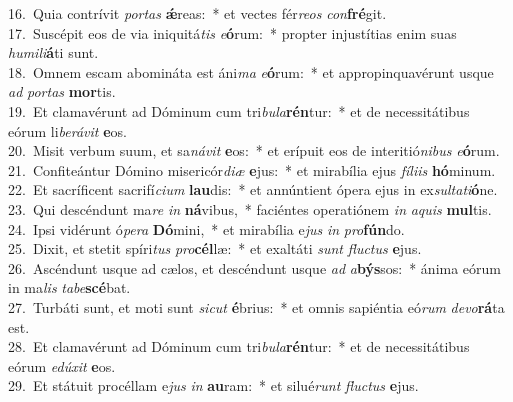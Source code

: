 {16.~}Quia contrívit \textit{por}\textit{tas} \textbf{ǽ}reas:~* et vectes fér\textit{re}\textit{os} \textit{con}\textbf{fré}git.\\
{17.~}Suscépit eos de via iniquitá\textit{tis} \textit{e}\textbf{ó}rum:~* propter injustítias enim suas \textit{hu}\textit{mi}\textit{li}\textbf{á}ti sunt.\\
{18.~}Omnem escam abomináta est áni\textit{ma} \textit{e}\textbf{ó}rum:~* et appropinquavérunt usque \textit{ad} \textit{por}\textit{tas} \textbf{mor}tis.\\
{19.~}Et clamavérunt ad Dóminum cum tri\textit{bu}\textit{la}\textbf{rén}tur:~* et de necessitátibus eórum li\textit{be}\textit{rá}\textit{vit} \textbf{e}os.\\
{20.~}Misit verbum suum, et sa\textit{ná}\textit{vit} \textbf{e}os:~* et erípuit eos de interitió\textit{ni}\textit{bus} \textit{e}\textbf{ó}rum.\\
{21.~}Confiteántur Dómino misericór\textit{di}\textit{æ} \textbf{e}jus:~* et mirabília ejus \textit{fí}\textit{li}\textit{is} \textbf{hó}minum.\\
{22.~}Et sacríficent sacrifí\textit{ci}\textit{um} \textbf{lau}dis:~* et annúntient ópera ejus in ex\textit{sul}\textit{ta}\textit{ti}\textbf{ó}ne.\\
{23.~}Qui descéndunt ma\textit{re} \textit{in} \textbf{ná}vibus,~* faciéntes operatiónem \textit{in} \textit{a}\textit{quis} \textbf{mul}tis.\\
{24.~}Ipsi vidérunt ó\textit{pe}\textit{ra} \textbf{Dó}mini,~* et mirabília e\textit{jus} \textit{in} \textit{pro}\textbf{fún}do.\\
{25.~}Dixit, et stetit spíri\textit{tus} \textit{pro}\textbf{cél}læ:~* et exaltáti \textit{sunt} \textit{flu}\textit{ctus} \textbf{e}jus.\\
{26.~}Ascéndunt usque ad cælos, et descéndunt usque \textit{ad} \textit{a}\textbf{býs}sos:~* ánima eórum in ma\textit{lis} \textit{ta}\textit{be}\textbf{scé}bat.\\
{27.~}Turbáti sunt, et moti sunt \textit{si}\textit{cut} \textbf{é}brius:~* et omnis sapiéntia eó\textit{rum} \textit{de}\textit{vo}\textbf{rá}ta est.\\
{28.~}Et clamavérunt ad Dóminum cum tri\textit{bu}\textit{la}\textbf{rén}tur:~* et de necessitátibus eórum \textit{e}\textit{dú}\textit{xit} \textbf{e}os.\\
{29.~}Et státuit procéllam e\textit{jus} \textit{in} \textbf{au}ram:~* et silué\textit{runt} \textit{flu}\textit{ctus} \textbf{e}jus.\\
